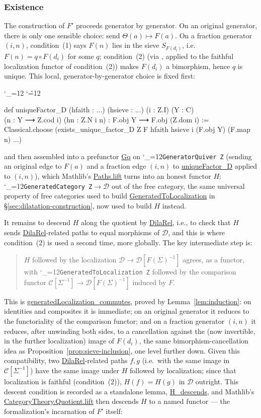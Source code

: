 \documentclass[11pt]{amsart}
\newcommand{\lc}[1]{\url{#1}}
\newcommand{\lcode}{\begingroup\catcode`\_=12\relax\lcodeInner}
\newcommand{\lcodeInner}[1]{\texttt{#1}\endgroup}
\newenvironment{leancode}{%
  \begingroup
  \catcode`\_=12\relax
  \catcode`\^=12\relax
  \small\ttfamily\raggedright\baselineskip=1.15\baselineskip
  \par\smallskip\noindent
}{%
  \par\smallskip
  \endgroup
}
\theoremstyle{plain}
\theoremstyle{definition}
\theoremstyle{remark}
\newcommand{\calC}{\mathcal C}
\newcommand{\calD}{\mathcal D}
\begin{document}
\subsubsection{Existence}

The construction of $F'$ proceeds generator by generator. On an original generator, there is
only one sensible choice: send $\Theta(a) \mapsto F(a)$. On a fraction generator $(i,n)$,
condition~(1) says $F(n)$ lies in the sieve $S_{F(d_i)}$, i.e.\ $F(n) = q \circ F(d_i)$ for
some $q$; condition~(2) (via \citep[Fact~3.2]{Mayeux}, applied to the faithful localization functor of
condition~(2)) makes $F(d_i)$ a bimorphism, hence $q$ is unique. This local,
generator-by-generator choice is fixed first:

\begin{leancode}
def uniqueFactor_D (hfaith : ...) (hsieve : ...) (i : Z.I) (Y : C) \\
    (n : Y ⟶ Z.cod i) (hn : Z.N i n) : F.obj Y ⟶ F.obj (Z.dom i) := \\
  Classical.choose (exists_unique_factor_D Z F hfaith hsieve i (F.obj Y) (F.map n) ...) \\
\end{leancode}
and then assembled into a prefunctor \lc{Gq} on \lcode{GeneratorQuiver Z} (sending an original
edge to $F(a)$ and a fraction edge $(i,n)$ to \lc{uniqueFactor_D} applied to $(i,n)$), which
Mathlib's \lc{Paths.lift} turns into an honest functor
$H : $\lcode{GeneratedCategory Z}$ \to \calD$ out of the free category, the same universal
property of free categories used to build \lc{GeneratedToLocalization} in
\S\ref{sec:dilatation-construction}, now used to build $H$ instead.

It remains to descend $H$ along the quotient by \lc{DilaRel}, i.e., to check that $H$
sends \lc{DilaRel}-related paths to equal morphisms of $\calD$, and this is where
condition~(2) is used a second time, more globally. The key intermediate step is:
\begin{quote}
$H$ followed by the localization $\calD \to \calD[F(\Sigma)^{-1}]$ agrees, as a
functor, with \lcode{GeneratedToLocalization Z} followed by the comparison functor
$\calC[\Sigma^{-1}] \to \calD[F(\Sigma)^{-1}]$ induced by $F$.
\end{quote}
This is \lc{generatedLocalization_commutes}, proved by Lemma~\ref{lem:induction}: on
identities and composites it is immediate; on an original generator it reduces to the
functoriality of the comparison functor; and on a fraction generator $(i,n)$ it reduces,
after unwinding both sides, to a cancellation against the (now invertible, in the further
localization) image of $F(d_i)$, the same bimorphism-cancellation idea as
Proposition~\ref{prop:sieve-inclusion}, one level further down. Given this compatibility, two
\lc{DilaRel}-related paths $f,g$ (i.e.\ with the same image in $\calC[\Sigma^{-1}]$) have the
same image under $H$ followed by localization; since that localization is faithful
(condition~(2)), $H(f) = H(g)$ in $\calD$ outright. This descent condition is recorded as a
standalone lemma, \lc{H_descends}, and Mathlib's \lc{CategoryTheory.Quotient.lift} then
descends $H$ to a named functor --- the formalization's incarnation of $F'$ itself:
\end{document}
